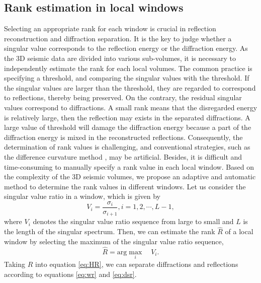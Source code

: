 \documentclass[10pt]{IEEEtran}
\begin{document}
\subsection{Rank estimation in local windows}
Selecting an appropriate rank for each window is crucial in reflection reconstruction and diffraction separation. 
It is the key to judge whether a singular value corresponds to the reflection energy or the diffraction energy.
As the 3D seismic data are divided into various sub-volumes, it is necessary to independently estimate the rank for each local volumes. 
The common practice is specifying a threshold, and comparing the singular values with the threshold. 
If the singular values are larger than the threshold, they are regarded to correspond to reflections, thereby being preserved.
On the contrary, the residual singular values correspond to diffractions.
A small rank means that the disregarded energy is relatively large, then the reflection may exists in the separated diffractions.
A large value of threshold will damage the diffraction energy because a part of the diffraction energy is mixed in the  reconstructed reflections.
Consequently,  the determination of rank values is challenging, and conventional strategies, such as  the difference curvature method \cite{Vicente2011Simultaneous}, may be artificial. 
Besides, it is difficult and time-consuming to manually specify a rank value in each local window.
Based on the complexity of the 3D seismic volumes, we propose an adaptive and automatic method to determine the rank values in different windows.
Let us consider the singular value ratio in a window, which is given by
\begin{equation} \label{eq:svr}
V_i=\dfrac{\sigma_i}{\sigma_{i+1}},i=1,2,\cdots,L-1,
\end{equation}
where $V_i$ denotes the singular value ratio sequence from large to small and $L$ is the length of the singular spectrum. Then, we can estimate the rank $\hat{R}$ of a local window by selecting the maximum of  the singular value ratio sequence, 
\begin{equation} \label{eq:svr}
\hat{R}=\text{arg} \max\limits_i\quad V_i.
\end{equation}
Taking $\hat{R}$ into equation \ref{eq:HR}, we can separate diffractions and reflections according to equations \ref{eq:wr} and \ref{eq:dsr}. 
\end{document}

